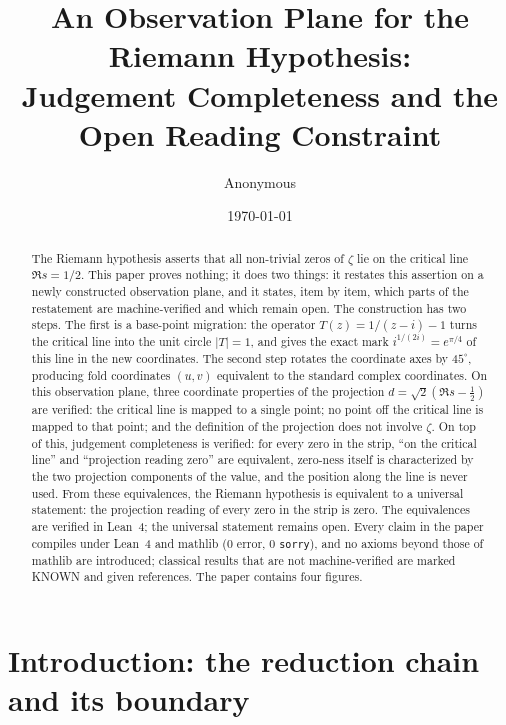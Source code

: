 \documentclass{article}
\title{An Observation Plane for the Riemann Hypothesis:\\
Judgement Completeness and the Open Reading Constraint}
\author{Anonymous}
\date{\today}
\renewcommand{\_}{\underscoreOrig\allowbreak}
\newcommand{\zt}{\zeta}
\begin{document}
\maketitle

\begin{abstract}
The Riemann hypothesis asserts that all non-trivial zeros of $\zt$ lie on
the critical line $\Re s=1/2$. This paper proves nothing; it does two
things: it restates this assertion on a newly constructed observation
plane, and it states, item by item, which parts of the restatement are
machine-verified and which remain open. The construction has two steps.
The first is a base-point migration: the operator $T(z)=1/(z-i)-1$ turns
the critical line into the unit circle $|T|=1$, and gives the exact mark
$i^{1/(2i)}=e^{\pi/4}$ of this line in the new coordinates. The second
step rotates the coordinate axes by $45^\circ$, producing fold
coordinates $(u,v)$ equivalent to the standard complex coordinates. On
this observation plane, three coordinate properties of the projection
$d=\sqrt2(\Re s-\frac12)$ are verified: the critical line is mapped to a
single point; no point off the critical line is mapped to that point; and
the definition of the projection does not involve $\zt$. On top of this,
judgement completeness is verified: for every zero in the strip, ``on the
critical line'' and ``projection reading zero'' are equivalent,
zero-ness itself is characterized by the two projection components of
the value, and the position along the line is never used. From these
equivalences, the Riemann hypothesis is equivalent to a universal
statement: the projection reading of every zero in the strip is zero.
The equivalences are verified in Lean~4; the universal statement remains
open. Every claim in the paper compiles under Lean~4 and mathlib
(0 error, 0 \texttt{sorry}), and no axioms beyond those of mathlib are
introduced; classical results that are not machine-verified are marked
KNOWN and given references. The paper contains four figures.
\end{abstract}

\section{Introduction: the reduction chain and its boundary}
\label{sec:intro}
\end{document}
